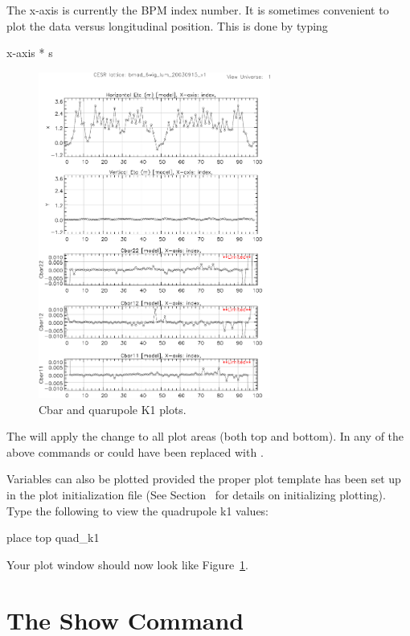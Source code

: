 The x-axis is currently the BPM index number. It is sometimes
convenient to plot the data versus longitudinal position. This is done
by typing
\begin{example}
  x-axis * s
\end{example}


\begin{figure}
  \centering
  \includegraphics[width=3in]{plot-coupling-no-IR.pdf}
  \caption{Cbar and quarupole K1 plots.}
  \label{f:plot.coupling.no.IR}
\end{figure}


The  will apply the change to all plot areas (both top and
bottom). In any of the above commands  or  could
have been replaced with .

Variables can also be plotted provided the proper plot template has
been set up in the plot initialization file (See
Section~ for details on initializing plotting). Type
the following to view the quadrupole k1 values:
\begin{example}
  place top quad_k1
\end{example}
Your plot window should now look like Figure~\ref{f:plot.coupling.no.IR}.

\section{The Show Command}

